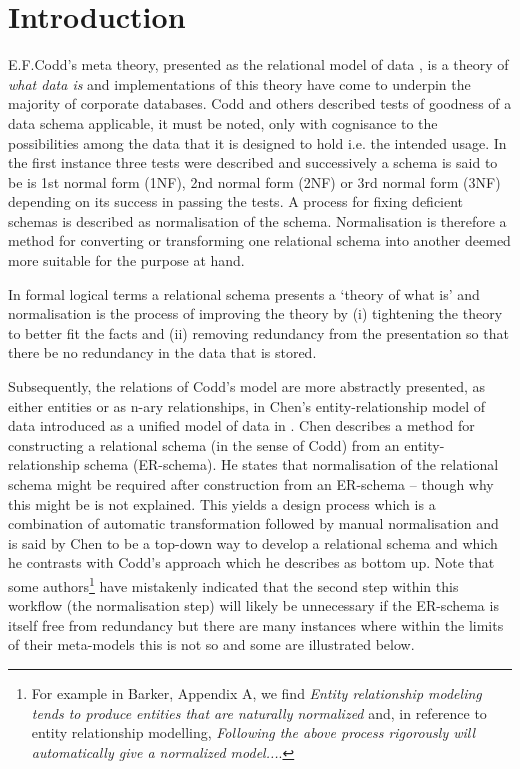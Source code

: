 

\section{Introduction}


E.F.Codd's meta theory, presented as the relational model of data \cite{Codd1970},
 is a theory of \textit{what data is} and implementations of this theory have come to underpin 
the majority of corporate databases.   Codd and others described tests of goodness of a data schema applicable, it must be noted, only with cognisance to the possibilities among the data that it is designed to hold i.e. the intended usage.
In the first instance three tests were described and successively a schema is said to be is 1st normal form (1NF), 2nd normal form (2NF) or 3rd normal form (3NF) depending on its success in passing the tests. A process for fixing deficient schemas is described as normalisation of the schema. 
Normalisation is therefore a method for converting or transforming one relational schema into another deemed more suitable for the purpose at hand. 

In formal logical terms a relational schema presents a `theory of what is' and normalisation is the process of improving the theory by (i) tightening the theory to better fit the facts and (ii) removing redundancy from the presentation so that there be no redundancy in the data that is stored.

Subsequently, the relations of Codd's model are more abstractly presented, as either entities or as n-ary relationships, in Chen's entity-relationship model of data introduced as a unified model of data in \cite{Chen1976}. 
Chen describes a method for constructing 
a relational schema (in the sense of Codd) from an entity-relationship schema (ER-schema).
He states that normalisation of the relational schema might be required after construction from an ER-schema -- though why this might be is not explained. 
This yields a design process which is a combination of automatic transformation followed by manual
normalisation and is said by Chen to be a top-down way to develop a relational schema and which he contrasts with Codd's approach which he describes as bottom up.
Note that some authors\footnote{For example in Barker, Appendix A,  we find \textit{Entity relationship modeling tends to produce entities that are naturally normalized} and, in reference to entity relationship modelling, \textit{Following the above process  rigorously will automatically give a normalized model...}. } have mistakenly indicated that the second step within this workflow 
(the normalisation step) will likely be unnecessary if the ER-schema is itself free from redundancy
but there are many instances where within the limits of their meta-models this is not so and some are illustrated below. 

